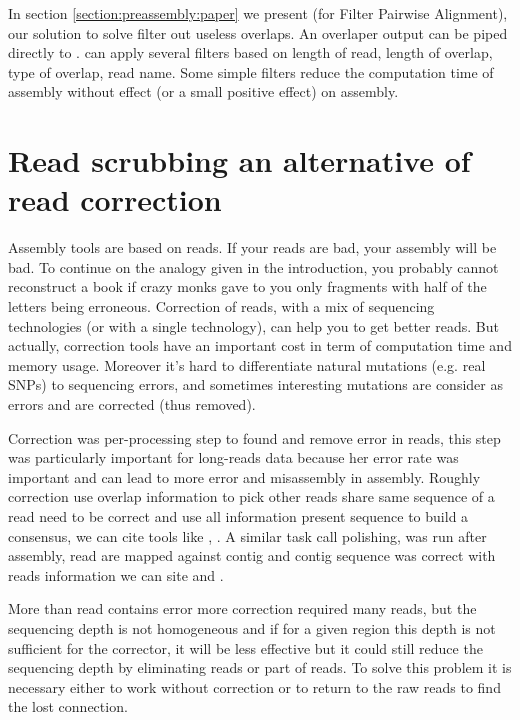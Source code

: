 \documentclass[main.tex]{subfiles}
\begin{document}
In section \ref{section:preassembly:paper} we present \fpa (for Filter Pairwise Alignment), our solution to solve filter out useless overlaps. An overlaper output can be piped directly to \fpa. \fpa can apply several filters based on length of read, length of overlap, type of overlap, read name. Some simple \fpa filters reduce the computation time of assembly without effect (or a small positive effect) on assembly.


\section{Read scrubbing an alternative of read correction} \label{sec:preasm:intro_yacrd}

Assembly tools are based on reads. If your reads are bad, your assembly will be bad. To continue on the analogy given in the introduction, you probably cannot reconstruct a book if crazy monks gave to you only fragments with half of the letters being erroneous. Correction of reads, with a mix of sequencing technologies (or with a single technology), can help you to get better reads. But actually, correction tools have an important cost in term of computation time and memory usage. Moreover it's hard to differentiate natural mutations (e.g. real SNPs) to sequencing errors, and sometimes interesting mutations are consider as errors and are corrected (thus removed).

Correction was per-processing step to found and remove error in reads, this step was particularly important for long-reads data because her error rate was important and can lead to more error and misassembly in assembly. Roughly correction use overlap information to pick other reads share same sequence of a read need to be correct and use all information present sequence to build a consensus, we can cite tools like \cite{MECAT}, \cite{CONSENT}. A similar task call polishing, was run after assembly, read are mapped against contig and contig sequence was correct with reads information we can site \cite{racon} and .

More than read contains error more correction required many reads, but the sequencing depth is not homogeneous and if for a given region this depth is not sufficient for the corrector, it will be less effective but it could still reduce the sequencing depth by eliminating reads or part of reads. To solve this problem it is necessary either to work without correction or to return to the raw reads to find the lost connection.
\end{document}
